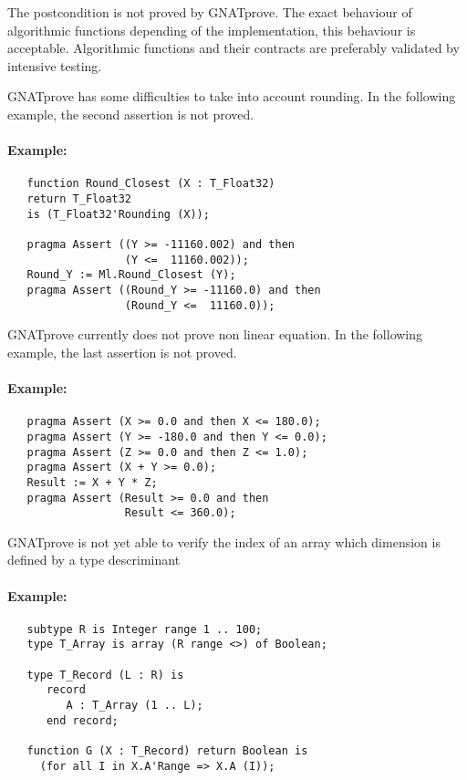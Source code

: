 \documentclass[10pt,a4paper,twocolumn]{article}
\newcommand{\gnatprove}{GNATprove\xspace}
\begin{document}
The postcondition is not proved by \gnatprove.
The exact behaviour of algorithmic functions depending of the implementation, this behaviour is acceptable.
Algorithmic functions and their contracts are preferably validated by intensive testing.

\gnatprove has some difficulties to take into account rounding.
In the following example, the second assertion is not proved.

\paragraph{Example:}

\begin{lstlisting}
   function Round_Closest (X : T_Float32)
   return T_Float32
   is (T_Float32'Rounding (X));

   pragma Assert ((Y >= -11160.002) and then
                  (Y <=  11160.002));
   Round_Y := Ml.Round_Closest (Y);
   pragma Assert ((Round_Y >= -11160.0) and then
                  (Round_Y <=  11160.0));
\end{lstlisting}

\gnatprove currently does not prove non linear equation.
In the following example, the last assertion is not proved.

\paragraph{Example:}

\begin{lstlisting}
   pragma Assert (X >= 0.0 and then X <= 180.0);
   pragma Assert (Y >= -180.0 and then Y <= 0.0);
   pragma Assert (Z >= 0.0 and then Z <= 1.0);
   pragma Assert (X + Y >= 0.0);
   Result := X + Y * Z;
   pragma Assert (Result >= 0.0 and then
                  Result <= 360.0);
\end{lstlisting}

\gnatprove is not yet able to verify the index of an array which dimension is defined by a type descriminant

\paragraph{Example:}

\begin{lstlisting}
   subtype R is Integer range 1 .. 100;
   type T_Array is array (R range <>) of Boolean;

   type T_Record (L : R) is
      record
         A : T_Array (1 .. L);
      end record;

   function G (X : T_Record) return Boolean is
     (for all I in X.A'Range => X.A (I));
\end{lstlisting}
\end{document}
